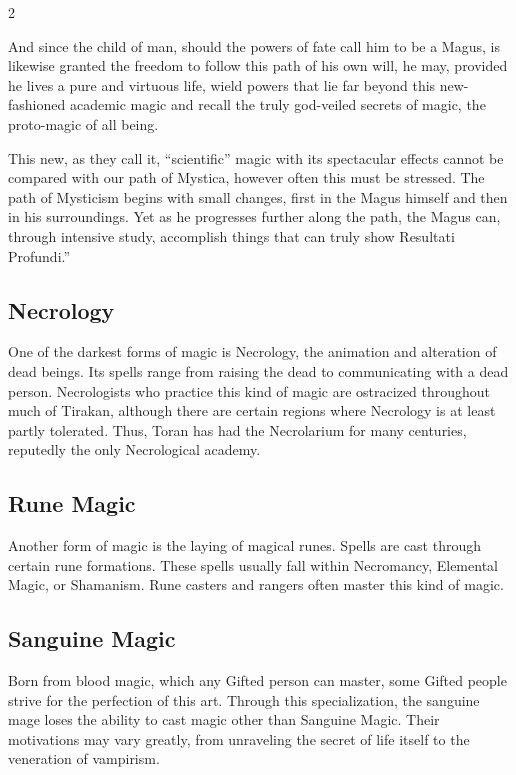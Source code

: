 \begin{multicols}{2}
{And since the child of man, should the powers of fate call him to be a Magus, is likewise granted the freedom to follow this path of his own will, he may, provided he lives a pure and virtuous life, wield powers that lie far beyond this new-fashioned academic magic and recall the truly god-veiled secrets of magic, the proto-magic of all being.

This new, as they call it, ``scientific'' magic with its spectacular effects cannot be compared with our path of Mystica, however often this must be stressed. The path of Mysticism begins with small changes, first in the Magus himself and then in his surroundings. Yet as he progresses further along the path, the Magus can, through intensive study, accomplish things that can truly show Resultati Profundi.''

\subsection{Necrology}\label{subsec:nekrologie}

One of the darkest forms of magic is Necrology, the animation and alteration of dead beings. Its spells range from raising the dead to communicating with a dead person. Necrologists who practice this kind of magic are ostracized throughout much of Tirakan, although there are certain regions where Necrology is at least partly tolerated. Thus, Toran has had the Necrolarium for many centuries, reputedly the only Necrological academy.

\subsection{Rune Magic}\label{subsec:runenmagie}

Another form of magic is the laying of magical runes. Spells are cast through certain rune formations. These spells usually fall within Necromancy, Elemental Magic, or Shamanism. Rune casters and rangers often master this kind of magic.

\subsection{Sanguine Magic}\label{subsec:sanguine-magie}

Born from blood magic, which any Gifted person can master, some Gifted people strive for the perfection of this art. Through this specialization, the sanguine mage loses the ability to cast magic other than Sanguine Magic. Their motivations may vary greatly, from unraveling the secret of life itself to the veneration of vampirism.

}
\end{multicols}
